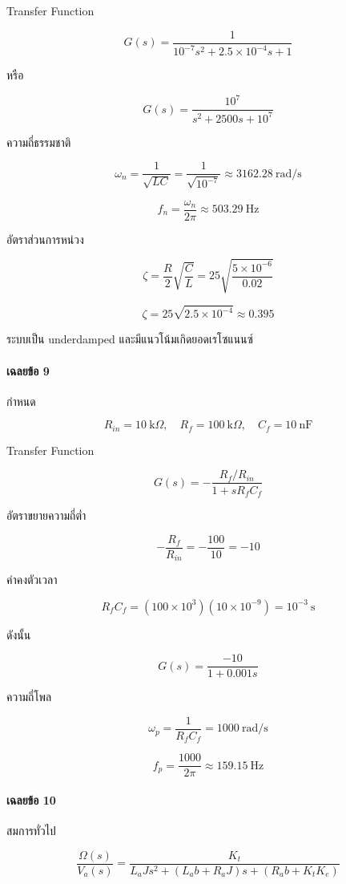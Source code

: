 Transfer Function

\[
\boxed{
G(s)=
\frac{1}{10^{-7}s^2+2.5\times10^{-4}s+1}
}
\]

หรือ

\[
\boxed{
G(s)=
\frac{10^7}{s^2+2500s+10^7}
}
\]

ความถี่ธรรมชาติ

\[
\omega_n=\frac{1}{\sqrt{LC}}
=\frac{1}{\sqrt{10^{-7}}}
\approx\boxed{3162.28\ \text{rad/s}}
\]

\[
f_n=\frac{\omega_n}{2\pi}
\approx\boxed{503.29\ \text{Hz}}
\]

อัตราส่วนการหน่วง

\[
\zeta=
\frac{R}{2}\sqrt{\frac{C}{L}}
=
25\sqrt{\frac{5\times10^{-6}}{0.02}}
\]

\[
\zeta
=25\sqrt{2.5\times10^{-4}}
\approx\boxed{0.395}
\]

ระบบเป็น underdamped และมีแนวโน้มเกิดยอดเรโซแนนซ์

\paragraph{เฉลยข้อ 9}

กำหนด

\[
R_{in}=10\ \text{k}\Omega,\quad
R_f=100\ \text{k}\Omega,\quad
C_f=10\ \text{nF}
\]

Transfer Function

\[
G(s)=
-\frac{R_f/R_{in}}{1+sR_fC_f}
\]

อัตราขยายความถี่ต่ำ

\[
-\frac{R_f}{R_{in}}
=-\frac{100}{10}
=\boxed{-10}
\]

ค่าคงตัวเวลา

\[
R_fC_f=(100\times10^3)(10\times10^{-9})
=10^{-3}\ \text{s}
\]

ดังนั้น

\[
\boxed{
G(s)=\frac{-10}{1+0.001s}
}
\]

ความถี่โพล

\[
\omega_p=\frac{1}{R_fC_f}
=\boxed{1000\ \text{rad/s}}
\]

\[
f_p=\frac{1000}{2\pi}
\approx\boxed{159.15\ \text{Hz}}
\]

\paragraph{เฉลยข้อ 10}

สมการทั่วไป

\[
\frac{\Omega(s)}{V_a(s)}
=
\frac{K_t}
{L_aJs^2+(L_ab+R_aJ)s+(R_ab+K_tK_e)}
\]

